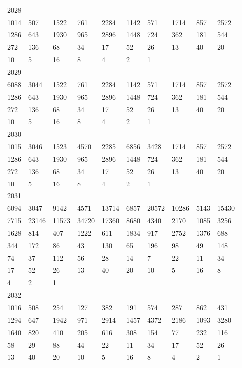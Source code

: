 \begin{longtable}{*{10}{l}}
2028&&&&&&&&&\\
1014& 507& 1522& 761& 2284& 1142& 571& 1714& 857& 2572\\
1286& 643& 1930& 965& 2896& 1448& 724& 362& 181& 544\\
272& 136& 68& 34& 17& 52& 26& 13& 40& 20\\
10& 5& 16& 8& 4& 2& 1& \\

2029&&&&&&&&&\\
6088& 3044& 1522& 761& 2284& 1142& 571& 1714& 857& 2572\\
1286& 643& 1930& 965& 2896& 1448& 724& 362& 181& 544\\
272& 136& 68& 34& 17& 52& 26& 13& 40& 20\\
10& 5& 16& 8& 4& 2& 1& \\

2030&&&&&&&&&\\
1015& 3046& 1523& 4570& 2285& 6856& 3428& 1714& 857& 2572\\
1286& 643& 1930& 965& 2896& 1448& 724& 362& 181& 544\\
272& 136& 68& 34& 17& 52& 26& 13& 40& 20\\
10& 5& 16& 8& 4& 2& 1& \\

2031&&&&&&&&&\\
6094& 3047& 9142& 4571& 13714& 6857& 20572& 10286& 5143& 15430\\
7715& 23146& 11573& 34720& 17360& 8680& 4340& 2170& 1085& 3256\\
1628& 814& 407& 1222& 611& 1834& 917& 2752& 1376& 688\\
344& 172& 86& 43& 130& 65& 196& 98& 49& 148\\
74& 37& 112& 56& 28& 14& 7& 22& 11& 34\\
17& 52& 26& 13& 40& 20& 10& 5& 16& 8\\
4& 2& 1& \\

2032&&&&&&&&&\\
1016& 508& 254& 127& 382& 191& 574& 287& 862& 431\\
1294& 647& 1942& 971& 2914& 1457& 4372& 2186& 1093& 3280\\
1640& 820& 410& 205& 616& 308& 154& 77& 232& 116\\
58& 29& 88& 44& 22& 11& 34& 17& 52& 26\\
13& 40& 20& 10& 5& 16& 8& 4& 2& 1\\


\end{longtable}
